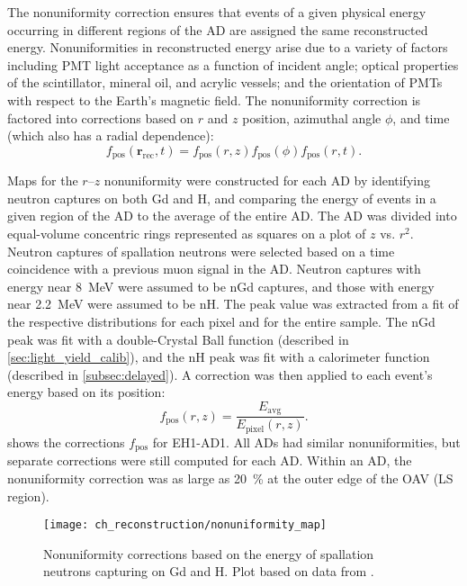 The nonuniformity correction ensures that events of a given physical energy
occurring in different regions of the AD
are assigned the same reconstructed energy.
Nonuniformities in reconstructed energy arise due to a variety of factors
including PMT light acceptance as a function of incident angle;
optical properties of the scintillator, mineral oil, and acrylic vessels;
and the orientation of PMTs with respect to the Earth's magnetic field.
The nonuniformity correction is factored into corrections based on
$r$ and $z$ position, azimuthal angle $\phi$, and time
(which also has a radial dependence):
\begin{equation}
    f_{\text{pos}}(\textbf{r}_{\text{rec}},t) =
    f_{\text{pos}}(r, z)f_{\text{pos}}(\phi)f_{\text{pos}}(r, t).
\end{equation}

Maps for the $r$--$z$ nonuniformity were constructed for each AD
by identifying neutron captures on both Gd and H,
and comparing the energy of events in a given region of the AD
to the average of the entire AD.
The AD was divided into equal-volume concentric rings
represented as squares on a plot of $z$ vs. $r^2$.
Neutron captures of spallation neutrons were selected
based on a time coincidence with a previous muon signal in the AD.
Neutron captures with energy near \SI{8}{\MeV} were assumed to be nGd captures,
and those with energy near \SI{2.2}{\MeV} were assumed to be nH.
The peak value was extracted from a fit of the respective distributions
for each pixel and for the entire sample.
The nGd peak was fit with a double-Crystal Ball function \cite{cbfunction}
(described in \cref{sec:light_yield_calib}),
and the nH peak was fit with a calorimeter function \cite{calorimeter2016}
(described in \cref{subsec:delayed}).
A correction was then applied to each event's energy based on its position:
\begin{equation}
    f_{\text{pos}}(r, z) = \frac{E_{\text{avg}}}{E_{\text{pixel}}(r,z)}.
\end{equation}
 shows the corrections $f_{\text{pos}}$ for EH1-AD1.
All ADs had similar nonuniformities, but separate corrections were still computed
for each AD.
Within an AD, the nonuniformity correction was as large as \SI{20}{\percent}
at the outer edge of the OAV (LS region).

\begin{figure}
    \centering
    \texttt{[image: ch\_reconstruction/nonuniformity\_map]}
    \caption[Nonuniformity corrections]{
        Nonuniformity corrections based on the energy of spallation neutrons
        capturing on Gd and H.
        Plot based on data from \cite{nonuniformity2}.
    }
    \label{fig:nonuniformity_map}
\end{figure}

